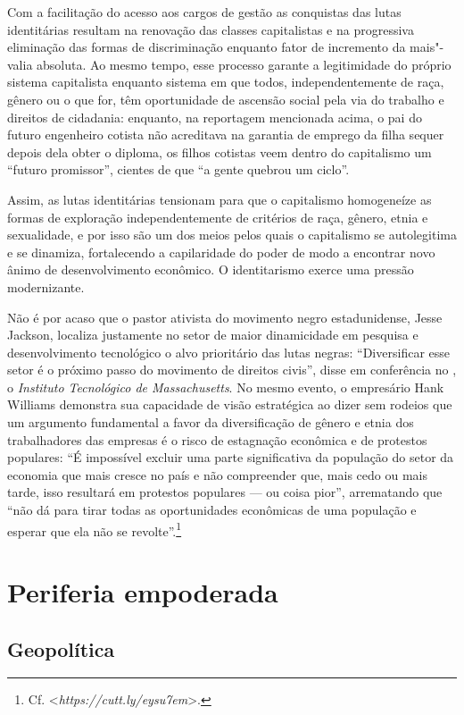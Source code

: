 Com a facilitação do acesso aos cargos de gestão as conquistas das lutas
identitárias resultam na renovação das classes capitalistas e na
progressiva eliminação das formas de discriminação enquanto fator de
incremento da mais"-valia absoluta. Ao mesmo tempo, esse processo garante
a legitimidade do próprio sistema capitalista enquanto sistema em que
todos, independentemente de raça, gênero ou o que for, têm oportunidade
de ascensão social pela via do trabalho e direitos de cidadania:
enquanto, na reportagem mencionada acima, o pai do futuro engenheiro
cotista não acreditava na garantia de emprego da filha sequer depois
dela obter o diploma, os filhos cotistas veem dentro do capitalismo um
``futuro promissor'', cientes de que ``a gente quebrou um ciclo''.

Assim, as lutas identitárias tensionam para que o capitalismo
homogeneíze as formas de exploração independentemente de critérios de
raça, gênero, etnia e sexualidade, e por isso são um dos meios pelos
quais o capitalismo se autolegitima e se dinamiza, fortalecendo a
capilaridade do poder de modo a encontrar novo ânimo de desenvolvimento
econômico. O identitarismo exerce uma pressão modernizante.

Não é por acaso que o pastor ativista do movimento negro estadunidense,
Jesse Jackson, localiza justamente no setor de maior dinamicidade em
pesquisa e desenvolvimento tecnológico o alvo prioritário das lutas
negras: ``Diversificar esse setor é o próximo passo do movimento de
direitos civis'', disse em conferência no , o \emph{Instituto
Tecnológico de Massachusetts}. No mesmo evento, o empresário Hank
Williams demonstra sua capacidade de visão estratégica ao dizer sem
rodeios que um argumento fundamental a favor da diversificação de gênero
e etnia dos trabalhadores das empresas é o risco de estagnação econômica
e de protestos populares: ``É impossível excluir uma parte significativa
da população do setor da economia que mais cresce no país e não
compreender que, mais cedo ou mais tarde, isso resultará em protestos
populares --- ou coisa pior'', arrematando que ``não dá para tirar todas
as oportunidades econômicas de uma população e esperar que ela não se
revolte''.\footnote{Cf. \textless{}\emph{https://cutt.ly/eysu7em}\textgreater{}.}

\chapter{Periferia empoderada}

\section{Geopolítica}

